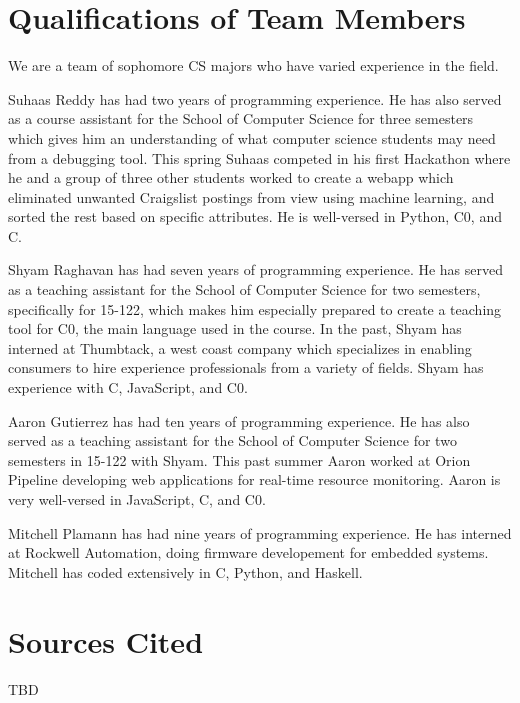 \documentclass[11pt]{article}
\begin{document}
\section{Qualifications of Team Members}
\par
We are a team of sophomore CS majors who have varied experience in the field.
\par
Suhaas Reddy has had two years of programming experience.  He has also served
as a course assistant for the School of Computer Science for three semesters
which gives him an understanding of what computer science students may need
from a debugging tool. This spring Suhaas competed in his first Hackathon where
he and a group of three other students worked to create a webapp which
eliminated unwanted Craigslist postings from view using machine learning, and
sorted the rest based on specific attributes.  He is well-versed in Python, C0,
and C.
\par
Shyam Raghavan has had seven years of programming experience.  He has served as
a teaching assistant for the School of Computer Science for two semesters,
specifically for 15-122, which makes him especially prepared to create a
teaching tool for C0, the main language used in the course.  In the past, Shyam
has interned at Thumbtack, a west coast company which specializes in enabling
consumers to hire experience professionals from a variety of fields.  Shyam has
experience with C, JavaScript, and C0.
\par
Aaron Gutierrez has had ten years of programming experience.  He has also served
as a teaching assistant for the School of Computer Science for two semesters in
15-122 with Shyam. This past summer Aaron worked at Orion Pipeline developing
web applications for real-time resource monitoring. Aaron is very well-versed in
JavaScript, C, and C0.
\par
Mitchell Plamann has had nine years of programming experience.  He has interned
at Rockwell Automation, doing firmware developement for embedded systems.
Mitchell has coded extensively in C, Python, and Haskell.

\section{Sources Cited}
TBD
\end{document}
